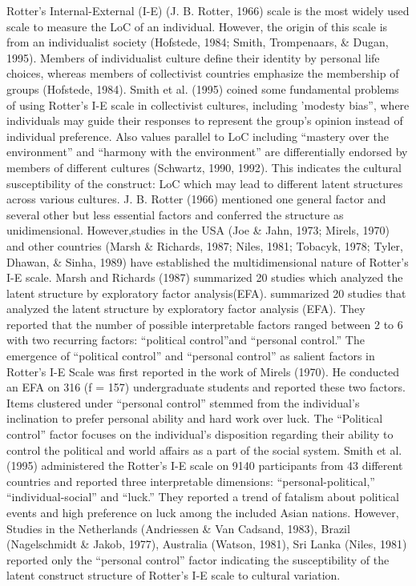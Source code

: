 \documentclass[
  english,
  man]{apa6}
\begin{document}
Rotter's Internal-External (I-E) (J. B. Rotter, 1966) scale is the most widely used scale to measure the LoC of an individual. However, the origin of this scale is from an individualist society (Hofstede, 1984; Smith, Trompenaars, \& Dugan, 1995). Members of individualist culture define their identity by personal life choices, whereas members of collectivist countries emphasize the membership of groups (Hofstede, 1984). Smith et al. (1995) coined some fundamental problems of using Rotter's I-E scale in collectivist cultures, including 'modesty bias'', where individuals may guide their responses to represent the group's opinion instead of individual preference. Also values parallel to LoC including ``mastery over the environment'' and ``harmony with the environment'' are differentially endorsed by members of different cultures (Schwartz, 1990, 1992). This indicates the cultural susceptibility of the construct: LoC which may lead to different latent structures across various cultures. J. B. Rotter (1966) mentioned one general factor and several other but less essential factors and conferred the structure as unidimensional. However,studies in the USA (Joe \& Jahn, 1973; Mirels, 1970) and other countries (Marsh \& Richards, 1987; Niles, 1981; Tobacyk, 1978; Tyler, Dhawan, \& Sinha, 1989) have established the multidimensional nature of Rotter's I-E scale. Marsh and Richards (1987) summarized 20 studies which analyzed the latent structure by exploratory factor analysis(EFA). summarized 20 studies that analyzed the latent structure by exploratory factor analysis (EFA). They reported that the number of possible interpretable factors ranged between 2 to 6 with two recurring factors: ``political control''and ``personal control.'' The emergence of ``political control'' and ``personal control'' as salient factors in Rotter's I-E Scale was first reported in the work of Mirels (1970). He conducted an EFA on 316 (f = 157) undergraduate students and reported these two factors. Items clustered under ``personal control'' stemmed from the individual's inclination to prefer personal ability and hard work over luck. The ``Political control'' factor focuses on the individual's disposition regarding their ability to control the political and world affairs as a part of the social system. Smith et al. (1995) administered the Rotter's I-E scale on 9140 participants from 43 different countries and reported three interpretable dimensions: ``personal-political,'' ``individual-social'' and ``luck.'' They reported a trend of fatalism about political events and high preference on luck among the included Asian nations. However, Studies in the Netherlands (Andriessen \& Van Cadsand, 1983), Brazil (Nagelschmidt \& Jakob, 1977), Australia (Watson, 1981), Sri Lanka (Niles, 1981) reported only the ``personal control'' factor indicating the susceptibility of the latent construct structure of Rotter's I-E scale to cultural variation.
\end{document}

